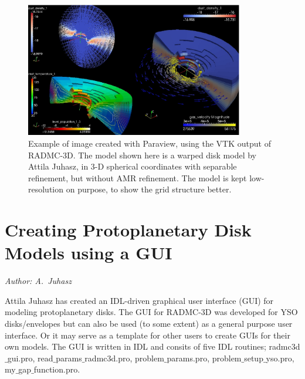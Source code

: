 \documentclass{report}
\begin{document}
%
\begin{figure}
\centerline{\includegraphics[width=0.85\textwidth]{model_juhasz_vtk_lowres.eps}}
\caption{\label{fig-modeljuhasz-with-vtk}
Example of image created with Paraview, using the VTK output of RADMC-3D.
The model shown here is a warped disk model by Attila Juhasz, in 3-D
spherical coordinates with separable refinement, but without AMR refinement.
The model is kept low-resolution on purpose, to show the grid structure
better.
}
\end{figure}
%


\chapter{Creating Protoplanetary Disk Models using a GUI}
\label{chap-gui-ppdisk}
%
\centerline{{\Large\em Author: A.~Juhasz}}\vspace{1em}
%
Attila Juhasz has created an IDL-driven graphical user interface (GUI) for
modeling protoplanetary disks. The GUI for RADMC-3D was developed for YSO
disks/envelopes but can also be used (to some extent) as a general purpose
user interface. Or it may serve as a template for other users to create GUIs
for their own models. The GUI is written in IDL and consits of five IDL
routines; radmc3d$\_$gui.pro, read$\_$params$\_$radmc3d.pro,
problem$\_$params.pro, problem$\_$setup$\_$yso.pro,
my$\_$gap$\_$function.pro.
\end{document}
